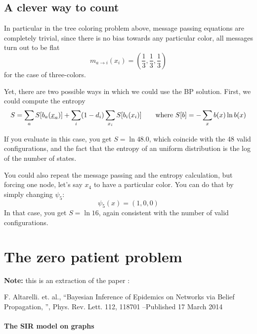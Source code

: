 \subsection{A clever way to count}

In particular in the tree coloring problem above, message passing equations are completely trivial, since there is no bias towards any particular color, all messages turn out to be flat
\[ m_{a\to i} (x_i) = (\frac 1 3,\frac 1 3,\frac 1 3)\]
for the case of three-colors.

Yet, there are two possible ways in which we could use the BP solution. First, we could compute the entropy
\[S = \sum_{a} S[b_a(\underline{x}_a)]+ \sum_i (1-d_i) \sum_{x_i} S[b_i(x_i)] \qquad \mbox{where } S[b] =  -\sum_{x} b(x) \ln b(x)\]

If you evaluate in this case, you get $S=\ln 48.0$, which coincide with the 48 valid configurations, and the fact that the entropy of an uniform distribution is the log of the number of states.

You could also repeat the message passing and the entropy calculation, but forcing one node, let's say $x_4$ to have a particular color. You can do that by simply changing $\psi_5$:
\[\psi_5(x) = (1,0,0) \]
In that case, you get $S = \ln 16$, again consistent with the number of valid configurations.

\section{The zero patient problem}

{\Large \bf Note:} this is an extraction of the paper :

F. Altarelli. et. al., ``Bayesian Inference of Epidemics on Networks via Belief Propagation, '', Phys. Rev. Lett. 112, 118701 --Published 17 March 2014


\paragraph*{The SIR model on graphs \label{sec:The-SIR-model-on-graphs}}

